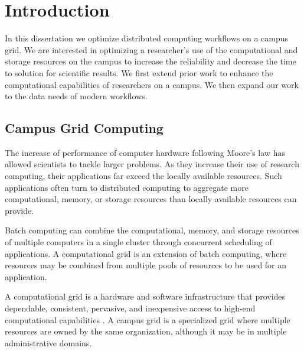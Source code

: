 \chapter{Introduction}

In this dissertation we optimize distributed computing workflows on a campus grid.  We are interested in optimizing a researcher's use of the computational and storage resources on the campus to increase the reliability and decrease the time to solution for scientific results.  We first extend prior work to enhance the computational capabilities of researchers on a campus.  We then expand our work to the data needs of modern workflows.

\section{Campus Grid Computing}

The increase of performance of computer hardware following Moore's law \cite{schaller1997moore} has allowed scientists to tackle larger problems.  As they increase their use of research computing, their applications far exceed the locally available resources.  Such applications often turn to distributed computing to aggregate more computational, memory, or storage resources than locally available resources can provide.


Batch computing can combine the computational, memory, and storage resources of multiple computers in a single cluster through concurrent scheduling of applications.  A computational grid is an extension of batch computing, where resources may be combined from multiple pools of resources to be used for an application.

A computational grid is a hardware and software infrastructure that provides dependable, consistent, pervasive, and inexpensive access to high-end computational capabilities \cite{foster2004grid}.  A campus grid is a specialized grid where multiple resources are owned by the same organization, although it may be in multiple administrative domains.  

